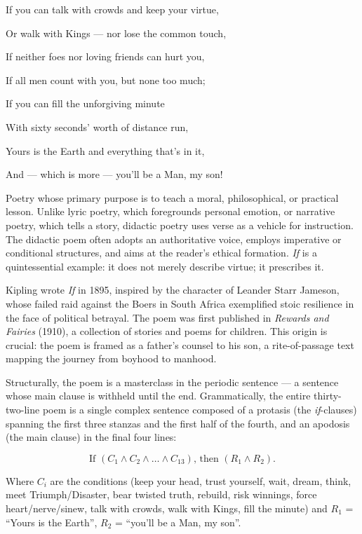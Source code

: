 \documentclass[11pt]{article}
\newcommand{\cle}[1]{{\popxbold\color{popdark}#1}}
\begin{document}
\begin{experience}
\medskip
\noindent If you can talk with crowds and keep your virtue,\par
Or walk with Kings — nor lose the common touch,\par
If neither foes nor loving friends can hurt you,\par
If all men count with you, but none too much;\par
If you can fill the unforgiving minute\par
With sixty seconds' worth of distance run,\par
Yours is the Earth and everything that's in it,\par
And — which is more — you'll be a Man, my son!
\end{experience}

\begin{definition}
Poetry whose primary purpose is to teach a moral, philosophical, or practical lesson. Unlike lyric poetry, which foregrounds personal emotion, or narrative poetry, which tells a story, didactic poetry uses verse as a vehicle for instruction. The didactic poem often adopts an authoritative voice, employs imperative or conditional structures, and aims at the reader's ethical formation. \emph{If} is a quintessential example: it does not merely describe virtue; it prescribes it.
\end{definition}

Kipling wrote \emph{If} in 1895, inspired by the character of Leander Starr Jameson, whose failed raid against the Boers in South Africa exemplified stoic resilience in the face of political betrayal. The poem was first published in \emph{Rewards and Fairies} (1910), a collection of stories and poems for children. This origin is crucial: the poem is framed as a father's counsel to his son, a rite-of-passage text mapping the journey from boyhood to manhood.

Structurally, the poem is a masterclass in the \cle{periodic sentence} — a sentence whose main clause is withheld until the end. Grammatically, the entire thirty-two-line poem is a single complex sentence composed of a \cle{protasis} (the \emph{if}-clauses) spanning the first three stanzas and the first half of the fourth, and an \cle{apodosis} (the main clause) in the final four lines:

\[
\text{If } (C_1 \land C_2 \land \dots \land C_{13}) \text{, then } (R_1 \land R_2).
\]

Where $C_i$ are the conditions (keep your head, trust yourself, wait, dream, think, meet Triumph/Disaster, bear twisted truth, rebuild, risk winnings, force heart/nerve/sinew, talk with crowds, walk with Kings, fill the minute) and $R_1$ = ``Yours is the Earth'', $R_2$ = ``you'll be a Man, my son''.
\end{document}

